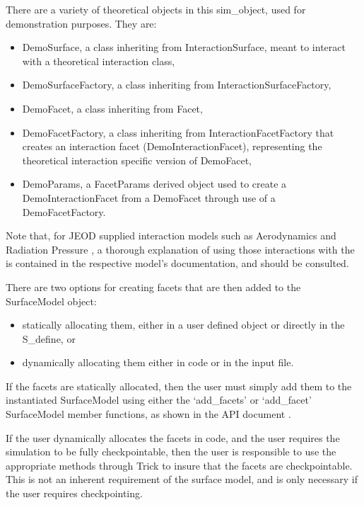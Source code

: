 There are a variety of theoretical objects in this sim\_object, used
for demonstration purposes. They are:

\begin{itemize}
\item{DemoSurface}, a class inheriting from InteractionSurface, meant
to interact with a theoretical interaction class,
\item{DemoSurfaceFactory}, a class inheriting from InteractionSurfaceFactory,
\item{DemoFacet}, a class inheriting from Facet,
\item{DemoFacetFactory}, a class inheriting from InteractionFacetFactory
that creates an interaction facet (DemoInteractionFacet),
representing the theoretical
interaction specific version of DemoFacet,
\item{DemoParams}, a FacetParams derived object used to create
a DemoInteractionFacet from a DemoFacet through use of a DemoFacetFactory.
\end{itemize}

Note that, for JEOD supplied interaction models such as Aerodynamics
\cite{dynenv:AERODYNAMICS} and Radiation Pressure
\cite{dynenv:RADIATIONPRESSURE}, a thorough explanation of using
those interactions with the \ModelDesc is contained
in the respective model's documentation, and should be consulted.

There are two options for creating facets that are then added to the SurfaceModel
object:

\begin{itemize}
\item{statically allocating them, either in a user defined object or directly in
the S\_define, or}
\item{dynamically allocating them either in code or in the input file.}
\end{itemize}

If the facets are statically allocated, then the user must simply add them
to the instantiated SurfaceModel using either the
`add\_facets' or `add\_facet' SurfaceModel member functions, as shown
in the API document \cite{surfacemodelbib:ReferenceManual}.

If the user dynamically allocates the facets in code, and the user requires
the simulation to be fully checkpointable, then the user is responsible
to use the appropriate methods through Trick to insure that the facets
are checkpointable. This is not an inherent requirement of the surface model, and
is only necessary if the user requires checkpointing.


